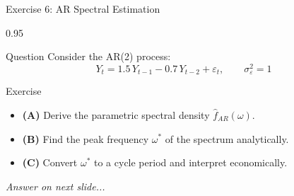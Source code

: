 \documentclass[9pt, aspectratio=169, t]{beamer}
\begin{document}
\begin{frame}{Exercise 6: AR Spectral Estimation}
    \begin{cminipage}{0.95\textwidth}
    \begin{alertblock}{Question}
        Consider the AR(2) process:
        \[
            Y_t = 1.5\,Y_{t-1} - 0.7\,Y_{t-2} + \varepsilon_t, \qquad \sigma^2_\varepsilon = 1
        \]
    \end{alertblock}

    \vspace{0.2cm}

    \begin{block}{Exercise}
        \begin{itemize}\setlength{\itemsep}{3pt}
            \item \textcolor{MainBlue}{\textbf{(A)}} Derive the parametric spectral density $\hat{f}_{AR}(\omega)$.
            \item \textcolor{MainBlue}{\textbf{(B)}} Find the peak frequency $\omega^*$ of the spectrum analytically.
            \item \textcolor{MainBlue}{\textbf{(C)}} Convert $\omega^*$ to a cycle period and interpret economically.
        \end{itemize}
    \end{block}

    \vspace{0.3cm}

    \begin{center}
        \textit{Answer on next slide...}
    \end{center}
    \end{cminipage}
\end{frame}
\end{document}
